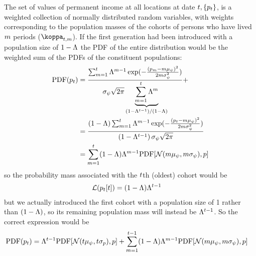 \documentclass[\econtexRoot/BufferStockTheory.tex]{subfiles}
\begin{document}
The set of values of permanent income at all locations at date $t,\{p_{t}\}$, is a weighted collection of normally distributed random variables, with weights corresponding to the population masses of the cohorts of persons who have lived $m$ periods ($\wgt_{\FutPer,\LooPer}$).  If the first generation had been introduced with a population size of $1-\Lambda$ the PDF of the entire distribution would be the weighted sum of the PDFs of the constituent populations:
\begin{equation}\begin{gathered}\begin{aligned}\label{eq:limInvariantP}
  \textrm{PDF}(p_{t}) & = \frac{\sum _{m=1}^{t} 
                          \Lambda^{m-1}
                          \exp({-\frac{(p_{m}-m \mu_{\psi} )^2}{2
                          m \sigma_{\psi} ^2}})}{
                          \sigma_{\psi} \sqrt{2 \pi }
                          \underbrace{
                          \sum_{m=1}^{t}\Lambda^{m}
                          }_{\left(1-\Lambda^{t-1}\right)/(1-\Lambda)}
                          }+
  \\ &= \frac{                            \left(1-\Lambda\right) \sum _{m=1}^{t} 
       \Lambda^{m-1}
       \exp({-\frac{(p_{t}-m \mu_{\psi} )^2}{
       2                      m \sigma_{\psi} ^2}})}{
       \left(1-\Lambda^{t-1}\right)
       \sigma_{\psi} \sqrt{2 \pi }
       }
  \\     & = \sum_{m=1}^{t}(1-\Lambda)\Lambda^{m-1} \textrm{PDF}[\mathcal{N}(m \mu_{\psi},m \sigma_{\psi}),p] \label{eq:pdfsum}
\end{aligned}\end{gathered}\end{equation}
so the probability mass associated with the $t$th (oldest) cohort would be
\begin{equation}\begin{gathered}\begin{aligned}
  \mathcal{L}(p_{t}[t]) &= (1-\Lambda)\Lambda^{t-1}
                                     \label{eq:wgtLast}
\end{aligned}\end{gathered}\end{equation}
but we actually introduced the first cohort with a population size of 1 rather than $(1-\Lambda)$, so its remaining population mass will instead be $\Lambda^{t-1}$. So the correct expression would be 
\begin{equation}\begin{gathered}\begin{aligned}
  \textrm{PDF}(p_{t})      & = \Lambda^{t-1}\textrm{PDF}[\mathcal{N}(t \mu_{\psi}, t \sigma_{p}),p]+\sum_{m=1}^{t-1}(1-\Lambda)\Lambda^{m-1} \textrm{PDF}[\mathcal{N}(m \mu_{\psi},m \sigma_{\psi}),p] \label{eq:PDFp}
\end{aligned}\end{gathered}\end{equation}
\end{document}
